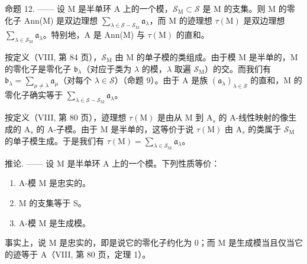 命题 12. —— 设 M 是半单环 A 上的一个模，\(\mathcal{S}_{\mathrm{M}} \subset \mathcal{S}\) 是 M 的支集。则 M 的零化子 Ann(M) 是双边理想 \(\sum_{\lambda \in \mathcal{S} - \mathcal{S}_{\mathrm{M}}} \mathfrak{a}_{\lambda}\)，而 M 的迹理想 \(\tau(\mathrm{M})\) 是双边理想 \(\sum_{\lambda \in \mathcal{S}_{\mathrm{M}}} \mathfrak{a}_{\lambda}\)。特别地，A 是 Ann(M) 与 \(\tau(\mathrm{M})\) 的直和。

按定义（VIII, 第 84 页），\(\mathcal{S}_{\mathrm{M}}\) 由 M 的单子模的类组成。由于模 M 是半单的，M 的零化子是零化子 \(\mathfrak{b}_{\lambda}\)（对应于类为 \(\lambda\) 的模，\(\lambda\) 取遍 \(\mathcal{S}_{\mathrm{M}}\)）的交。而我们有 \(\mathfrak{b}_{\lambda} = \sum_{\mu \neq \lambda} \mathfrak{a}_{\mu}\)（对每个 \(\lambda \in \mathcal{S}\)）（命题 9）。由于 A 是族 \((\mathfrak{a}_{\lambda})_{\lambda \in \mathcal{S}}\) 的直和，M 的零化子确实等于 \(\sum_{\lambda \in \mathcal{S} - \mathcal{S}_{\mathrm{M}}} \mathfrak{a}_{\lambda}\)。

按定义（VIII, 第 80 页），迹理想 \(\tau(\mathrm{M})\) 是由从 M 到 \(\mathrm{A}_s\) 的 A-线性映射的像生成的 \(\mathrm{A}_s\) 的 A-子模。由于 M 是半单的，这等价于说 \(\tau(\mathrm{M})\) 由 \(\mathrm{A}_s\) 的类属于 \(\mathcal{S}_{\mathrm{M}}\) 的单子模生成。于是我们有 \(\tau(\mathrm{M}) = \sum_{\lambda \in \mathcal{S}_{\mathrm{M}}} \mathfrak{a}_{\lambda}\)。

推论. —— 设 M 是半单环 A 上的一个模。下列性质等价：

\begin{enumerate}
\def\labelenumi{(\roman{enumi})}
\item
  A-模 M 是忠实的。
\item
  M 的支集等于 S。
\item
  A-模 M 是生成模。
\end{enumerate}

事实上，说 M 是忠实的，即是说它的零化子约化为 0；而 M 是生成模当且仅当它的迹等于 A（VIII, 第 80 页，定理 1）。

